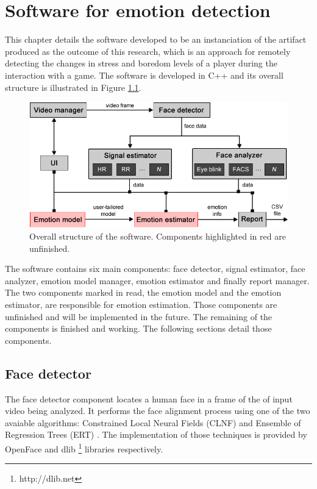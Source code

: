 \chapter{Software for emotion detection}
\label{ch:software}

This chapter details the software developed to be an instanciation of the artifact produced as the outcome of this research, which is an approach for remotely detecting the changes in stress and boredom levels of a player during the interaction with a game. The software is developed in C++ and its overall structure is illustrated in Figure \ref{fig:tool-overall-structure}.

\begin{figure}[h]
    \centering
    \includegraphics[width=\textwidth]{figures/tool-overall-structure.png}
    \caption{Overall structure of the software. Components highlighted in red are unfinished.}
    \label{fig:tool-overall-structure}
\end{figure}

The software contains six main components: face detector, signal estimator, face analyzer, emotion model manager, emotion estimator and finally report manager. The two components marked in read, the emotion model and the emotion estimator, are responsible for emotion estimation. Those components are unfinished and will be implemented in the future. The remaining of the components is finished and working. The following sections detail those components.

\section{Face detector}

The face detector component locates a human face in a frame of the of input video being analyzed. It performs the face alignment process using one of the two avaiable algorithms: Constrained Local Neural Fields (CLNF) \parencite{baltrusaitis2013constrained} and Ensemble of Regression Trees (ERT) \parencite{kazemi2014one}. The implementation of those techniques is provided by OpenFace \parencite{baltruvsaitis2016openface} and dlib \footnote{http://dlib.​net} libraries respectively.

